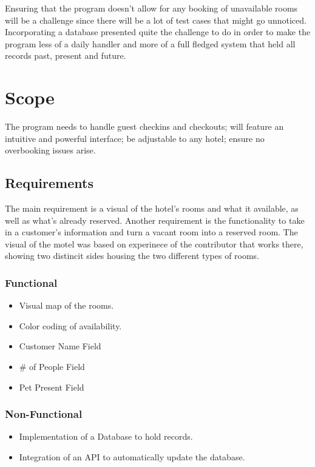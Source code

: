 \documentclass[10pt,conference,onecolumn,compsoc]{IEEEtran}
\begin{document}
Ensuring that the program doesn't allow for any booking of unavailable rooms will be a challenge since there will be a lot of test cases that might go unnoticed.
Incorporating a database presented quite the challenge to do in order to make the program less of a daily handler and more of a full fledged system that held all records past, present and future.


\section{Scope}
The program needs to handle guest checkins and checkouts; will feature an intuitive and powerful interface; be adjustable to any hotel; ensure no overbooking issues arise.

\subsection{Requirements}
The main requirement is a visual of the hotel's rooms and what it available, as well as what's already reserved. Another requirement is the functionality to take in a customer's information and turn a vacant room into a reserved room. The visual of the motel was based on experinece of the contributor that works there, showing two distincit sides housing the two different types of rooms. 

\subsubsection{Functional}
\begin{itemize}
\item Visual map of the rooms.
\item Color coding of availability.
\item Customer Name Field
\item \# of People Field
\item Pet Present Field
\end{itemize}

\subsubsection{Non-Functional}
\begin{itemize}
\item Implementation of a Database to hold records. 
\item Integration of an API to automatically update the database.
\end{itemize}
\end{document}
